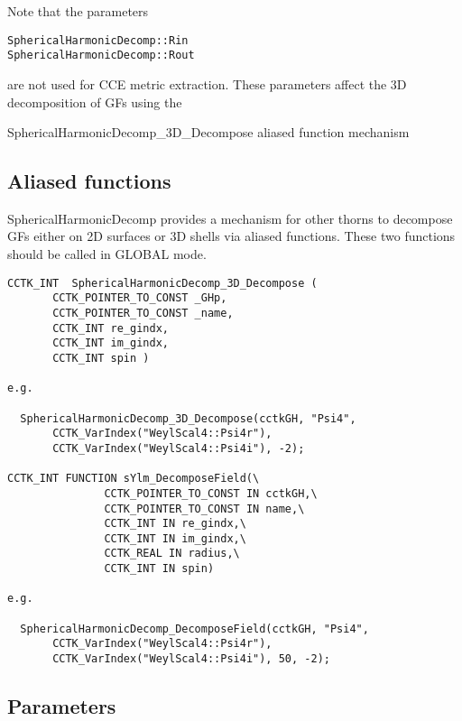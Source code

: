 Note that the parameters
\begin{verbatim}
SphericalHarmonicDecomp::Rin  
SphericalHarmonicDecomp::Rout  
\end{verbatim}
are not used for CCE metric extraction. These parameters affect the
3D decomposition of GFs using the

 SphericalHarmonicDecomp\_3D\_Decompose aliased function mechanism


\subsection{Aliased functions}
  SphericalHarmonicDecomp provides a mechanism for other thorns to decompose
GFs either on 2D surfaces or 3D shells via aliased functions.
These two functions should be called in GLOBAL mode.

\begin{verbatim}
CCTK_INT  SphericalHarmonicDecomp_3D_Decompose (
       CCTK_POINTER_TO_CONST _GHp,
       CCTK_POINTER_TO_CONST _name,
       CCTK_INT re_gindx,
       CCTK_INT im_gindx,
       CCTK_INT spin )

e.g.

  SphericalHarmonicDecomp_3D_Decompose(cctkGH, "Psi4",
       CCTK_VarIndex("WeylScal4::Psi4r"),
       CCTK_VarIndex("WeylScal4::Psi4i"), -2);

CCTK_INT FUNCTION sYlm_DecomposeField(\
               CCTK_POINTER_TO_CONST IN cctkGH,\
               CCTK_POINTER_TO_CONST IN name,\
               CCTK_INT IN re_gindx,\
               CCTK_INT IN im_gindx,\
               CCTK_REAL IN radius,\
               CCTK_INT IN spin)

e.g.

  SphericalHarmonicDecomp_DecomposeField(cctkGH, "Psi4",
       CCTK_VarIndex("WeylScal4::Psi4r"),
       CCTK_VarIndex("WeylScal4::Psi4i"), 50, -2);

\end{verbatim}

\subsection{Parameters}

